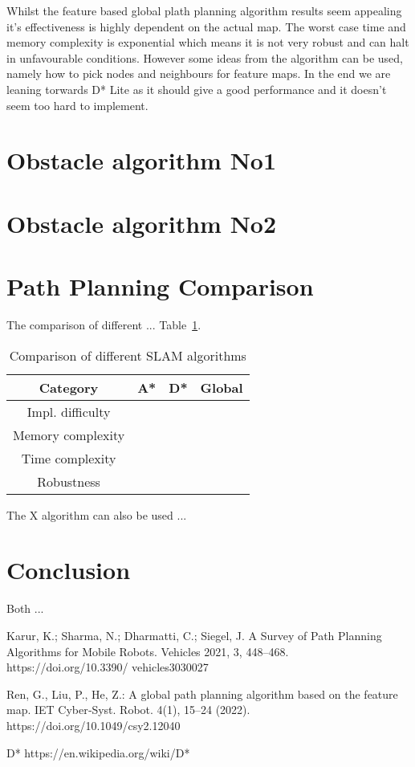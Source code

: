 \documentclass[12pt, a4paper, onecolumn]{article}
\begin{document}
Whilst the feature based global plath planning algorithm results seem appealing it's effectiveness is highly dependent on the actual map.
The worst case time and memory complexity is exponential which means it is not very robust and can halt in unfavourable conditions.
However some ideas from the algorithm can be used, namely how to pick nodes and neighbours for feature maps.
In the end we are leaning torwards D* Lite as it should give a good performance and it doesn't seem too hard to implement.

\section{Obstacle algorithm No1}

\section{Obstacle algorithm No2}

\section{Path Planning Comparison}
The comparison of different ...
Table~\ref{tab:path_algorithms}.
\begin{table}[h!]
  \begin{center}
    \begin{tabular}[c]{|c || c c c |}
      \hline
       Category        &  A*            & D*            & Global     \\
      \hline
      Impl. difficulty &         &  &      \\
      \hline
      Memory complexity&          &           &      \\
      \hline
      Time complexity  &          &         &      \\
      \hline
      Robustness       &           &         &      \\
      \hline
    \end{tabular}
  \end{center}
  \caption{Comparison of different SLAM algorithms}
  \label{tab:path_algorithms}
\end{table}
The X algorithm can also be used ...

\section{Conclusion}

Both ... 
\newpage
\begin{thebibliography}{9}

Karur, K.; Sharma, N.;
Dharmatti, C.; Siegel, J. A Survey of
Path Planning Algorithms for Mobile
Robots. Vehicles 2021, 3, 448–468.
https://doi.org/10.3390/
vehicles3030027

Ren, G., Liu, P., He, Z.: A
global path planning algorithm based on the feature
map. IET Cyber‐Syst. Robot. 4(1), 15–24 (2022).
https://doi.org/10.1049/csy2.12040

D*
https://en.wikipedia.org/wiki/D*


\end{thebibliography}
\end{document}
